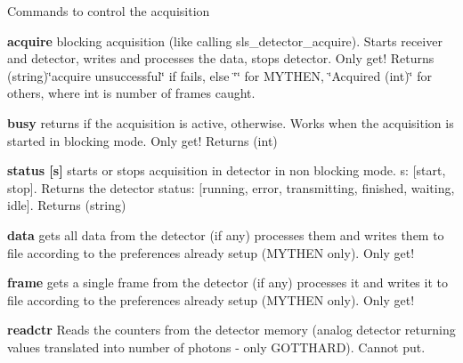 Commands to control the acquisition


\begin{DoxyItemize}
\item {\bfseries acquire} blocking acquisition (like calling sls\_\-detector\_\-acquire). Starts receiver and detector, writes and processes the data, stops detector. Only get! {\ttfamily Returns} (string){\ttfamily \char`\"{}acquire unsuccessful\char`\"{}} if fails, else \char`\"{}\char`\"{} for MYTHEN, {\ttfamily \char`\"{}Acquired (int)\char`\"{}} for others, where int is number of frames caught.
\end{DoxyItemize}


\begin{DoxyItemize}
\item {\bfseries busy} returns {} if the acquisition is active, {} otherwise. Works when the acquisition is started in blocking mode. Only get! {\ttfamily Returns} {\ttfamily }(int)
\end{DoxyItemize}


\begin{DoxyItemize}
\item {\bfseries  status \mbox{[}s\mbox{]} } starts or stops acquisition in detector in non blocking mode. {\ttfamily s:} \mbox{[}{\ttfamily start}, {\ttfamily stop}\mbox{]}. {\ttfamily Returns} the detector status: \mbox{[}{\ttfamily running}, {\ttfamily error}, {\ttfamily transmitting}, {\ttfamily finished}, {\ttfamily waiting}, {\ttfamily idle}\mbox{]}. {\ttfamily Returns} {\ttfamily }(string)
\end{DoxyItemize}


\begin{DoxyItemize}
\item {\bfseries data} gets all data from the detector (if any) processes them and writes them to file according to the preferences already setup (MYTHEN only). Only get!
\end{DoxyItemize}


\begin{DoxyItemize}
\item {\bfseries frame} gets a single frame from the detector (if any) processes it and writes it to file according to the preferences already setup (MYTHEN only). Only get!
\end{DoxyItemize}


\begin{DoxyItemize}
\item {\bfseries readctr } Reads the counters from the detector memory (analog detector returning values translated into number of photons -\/ only GOTTHARD). Cannot put.
\end{DoxyItemize}


